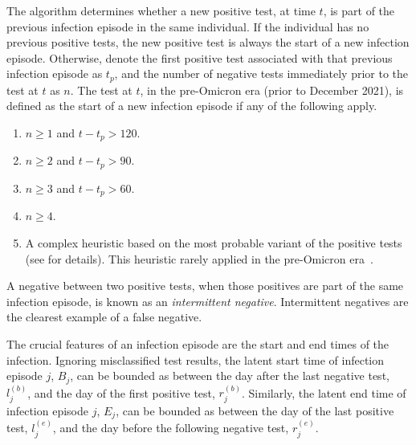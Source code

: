 \documentclass[thesis.tex]{subfiles}
\begin{document}
The algorithm determines whether a new positive test, at time $t$, is part of the previous infection episode in the same individual.
If the individual has no previous positive tests, the new positive test is always the start of a new infection episode.
Otherwise, denote the first positive test associated with that previous infection episode as $t_p$, and the number of negative tests immediately prior to the test at $t$ as $n$.
The test at $t$, in the pre-Omicron era (prior to December 2021), is defined as the start of a new infection episode if any of the following apply.
\begin{enumerate}
  \item $n \geq 1$ and $t - t_p > 120$.
  \item $n \geq 2$ and $t - t_p > 90$.
  \item $n \geq 3$ and $t - t_p > 60$.
  \item $n \geq 4$.
  \item A complex heuristic based on the most probable variant of the positive tests (see \textcite{weiRisk} for details). This heuristic rarely applied in the pre-Omicron era~.
\end{enumerate}

A negative between two positive tests, when those positives are part of the same infection episode, is known as an \emph{intermittent negative}.
Intermittent negatives are the clearest example of a false negative.

The crucial features of an infection episode are the start and end times of the infection.
Ignoring misclassified test results, the latent start time of infection episode $j$, $B_j$, can be bounded as between the day after the last negative test, $l_j^{(b)}$, and the day of the first positive test, $r_j^{(b)}$.
Similarly, the latent end time of infection episode $j$, $E_j$, can be bounded as between the day of the last positive test, $l_j^{(e)}$, and the day before the following negative test, $r_j^{(e)}$.
\end{document}
